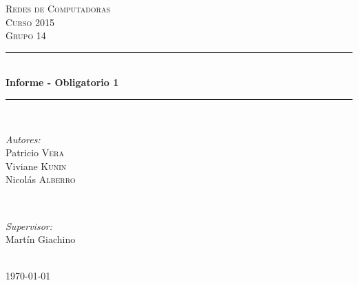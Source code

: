 \documentclass[12pt]{article} %
\begin{document}

\begin{titlepage}

\newcommand{\HRule}{\rule{\linewidth}{0.5mm}} %

\center %

\textsc{\LARGE Redes de Computadoras}\\[1.5cm] %
\textsc{\Large Curso 2015}\\[0.5cm] %
\textsc{\large Grupo 14}\\[0.5cm] %

\HRule \\[0.4cm]
{ \huge \bfseries Informe - Obligatorio 1}\\[0.4cm] %
\HRule \\[1.5cm]

\begin{minipage}{0.4\textwidth}
\begin{flushleft} \large
\emph{Autores:}\\
Patricio \textsc{Vera}\\ %
Viviane \textsc{Kunin}\\ %
Nicolás \textsc{Alberro} %
\end{flushleft}
\end{minipage}
~
\begin{minipage}{0.4\textwidth}
\begin{flushright} \large
\emph{Supervisor:} \\
Martín Giachino  %
\end{flushright}
\end{minipage}\\[4cm]

{\large \today}\\[3cm] %


\vfill %

\end{titlepage}
\end{document}
